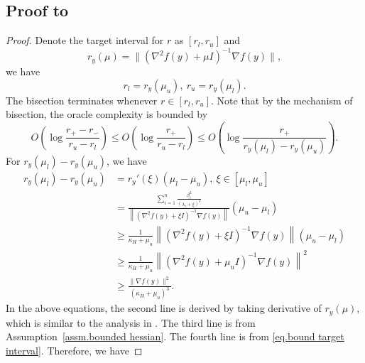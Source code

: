 \documentclass{mcom-l}
\numberwithin{equation}{section}
\begin{document}
\subsection*{Proof to }
\begin{proof}
    Denote the target interval for $r$ as $[r_l,r_u]$ and
    \begin{equation*}
        r_y(\mu)=\|\left (\nabla^2 f(y)+\mu I\right)^{-1}\nabla f(y)\|,
    \end{equation*}
    we have
    \begin{equation*}
        r_l = r_y(\mu_u), \ r_u=r_y(\mu_l).
    \end{equation*}
    The bisection terminates whenever $r\in[r_l,r_u]$. Note that by the mechanism of bisection, the oracle complexity is bounded by
    \begin{equation*}
        O\left(\log\frac{r_+-r_-}{r_u-r_l}\right)\leq O\left(\log\frac{r_+}{r_u-r_l}\right) \leq O\left(\log\frac{r_+}{r_y(\mu_l)-r_y(\mu_u)}\right).
    \end{equation*}
    For $r_y(\mu_l)-r_y(\mu_u)$, we have
    \begin{equation*}
        \begin{aligned}
            r_y(\mu_l)-r_y(\mu_u) & =r_y'(\xi)(\mu_l-\mu_u), \ \xi\in[\mu_l,\mu_u]                                                                                         \\
                                  & =\frac{\sum_{i=1}^n \frac{\beta_i^2}{(\lambda_i+\xi)^3}}{\left\|\left(\nabla^2 f(y)+\xi I\right)^{-1}\nabla f(y)\right\|}(\mu_u-\mu_l) \\
                                  & \geq \frac{1}{\kappa_H+\mu_u} \left\|\left(\nabla^2 f(y)+\xi I\right)^{-1}\nabla f(y)\right\|(\mu_u-\mu_l)                             \\
                                  & \geq \frac{1}{\kappa_H+\mu_u} \left\|\left(\nabla^2 f(y)+\mu_u I\right)^{-1}\nabla f(y)\right\|^2                                      \\
                                  & \geq \frac{\|\nabla f(y)\|^2}{(\kappa_H+\mu_u)^3}.
        \end{aligned}
    \end{equation*}
    In the above equations, the second line is derived by taking derivative of $r_y(\mu)$, which is similar to the analysis in . The third line is from Assumption~\ref{assm.bounded hessian}. The fourth line is from \eqref{eq.bound target interval}. Therefore, we have

\end{proof}
\end{document}
